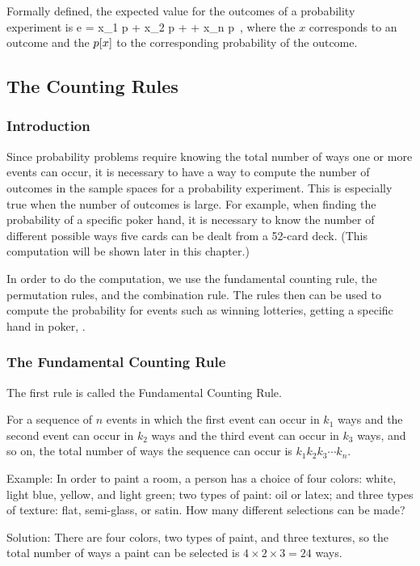Formally defined, the expected value for the outcomes of a probability experiment is 
\beq
e = x_1 p + x_2 p + \dotsb + x_n p \,,
\eeq
where the $x$ corresponds to an outcome and the $p\!\left[{x}\right]$ to the corresponding probability of the outcome.


\subsection{The Counting Rules} 

\subsubsection{Introduction}
Since probability problems require knowing the total number of ways one or more events can occur, it is necessary to have a way to compute the number of outcomes in the sample spaces for a probability experiment. This is especially true when the number of outcomes is large. For example, when finding the probability of a specific poker hand, it is necessary to know the number of different possible ways five cards can be dealt from a 52-card deck. (This computation will be shown later in this chapter.)

In order to do the computation, we use the fundamental counting rule, the permutation rules, and the combination rule. The rules then can be used to compute the probability for events such as winning lotteries, getting a specific hand in poker, \etc.


\subsubsection{The Fundamental Counting Rule}
The first rule is called the Fundamental Counting Rule.

For a sequence of $n$ events in which the first event can occur in $k_1$ ways and the second event can occur in $k_2$ ways and the third event can occur in $k_3$ ways, and so on, the total number of ways the sequence can occur is $k_1 k_2 k_3\dotsb k_n$.

Example: In order to paint a room, a person has a choice of four colors: white, light blue, yellow, and light green; two types of paint: oil or latex; and three types of texture: flat, semi-glass, or satin. How many different selections can be made?

Solution: There are four colors, two types of paint, and three textures, so the total number of ways a paint can be selected is $4\times 2\times 3 = 24$ ways.

